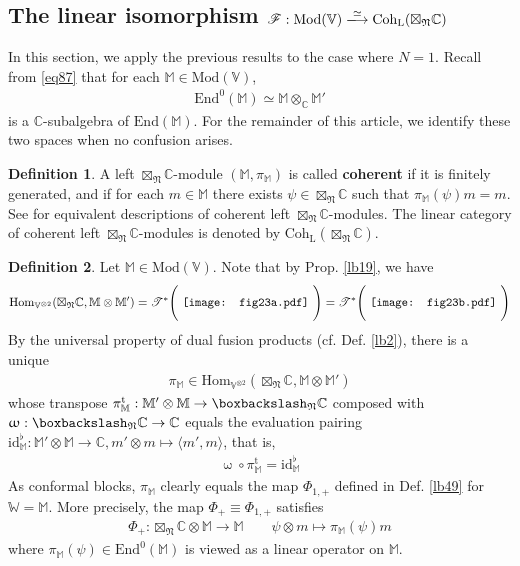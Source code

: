 \documentclass[11pt,b5paper,notitlepage]{article}
\theoremstyle{definition}
\newtheorem{df}{Definition}[section]
\theoremstyle{plain}
\newcommand{\tr}{\mathrm{t}} %
\newcommand{\End}{\mathrm{End}} %
\newcommand{\Hom}{\mathrm{Hom}}
\newcommand{\Vbb}{\mathbb V}
\newcommand{\Wbb}{\mathbb W}
\newcommand{\Mbb}{\mathbb M}
\newcommand{\Cbb}{\mathbb C}
\newcommand{\<}{\left\langle}
\renewcommand{\>}{\right\rangle}
\newcommand{\ST}{\mathscr{T}}
\newcommand{\SF}{\mathscr{F}}
\newcommand{\bk}[1]{\langle {#1}\rangle}
\newcommand{\bbs}{\boxbackslash}
\newcommand{\Mod}{\mathrm{Mod}}
\newcommand{\id}{\mathrm{id}}
\newcommand{\fn}{\mathfrak{N}}
\newcommand{\Coh}{{\mathrm{Coh}_{\mathrm L}}}
\numberwithin{equation}{section}
\begin{document}
\subsection{The linear isomorphism $\SF:\Mod(\Vbb)\xlongrightarrow{\simeq} \Coh(\boxtimes_\fn \Cbb)$}

In this section, we apply the previous results to the case where $N=1$. Recall from \eqref{eq87} that for each $\Mbb\in\Mod(\Vbb)$,
\begin{align*}
\End^0(\Mbb)\simeq \Mbb\otimes_\Cbb\Mbb'
\end{align*}
is a $\Cbb$-subalgebra of $\End(\Mbb)$. For the remainder of this article, we identify these two spaces when no confusion arises.



\begin{df}\label{lb83}
A left $\boxtimes_\fn\Cbb$-module $(\Mbb,\pi_\Mbb)$ is called \textbf{coherent} if it is finitely generated, and if for each $m\in\Mbb$ there exists $\psi\in\boxtimes_\fn\Cbb$ such that $\pi_\Mbb(\psi)m=m$. See \cite[Sec. 2]{GZ4} for equivalent descriptions of coherent left $\boxtimes_\fn\Cbb$-modules. The linear category of coherent left $\boxtimes_\fn\Cbb$-modules is denoted by $\pmb{\Coh(\boxtimes_\fn\Cbb)}$.
\end{df}

\begin{df}\label{lb57}
Let $\Mbb\in\Mod(\Vbb)$. Note that by Prop. \ref{lb19}, we have
\begin{align}
\Hom_{\Vbb^{\otimes2}}(\boxtimes_\fn\Cbb,\Mbb\otimes\Mbb')=\ST^*\Bigg(	\vcenter{\hbox{{
		\texttt{[image: fig23a.pdf]}}}} ~\Bigg)=\ST^*\Bigg(	\vcenter{\hbox{{
		\texttt{[image: fig23b.pdf]}}}} ~\Bigg)
\end{align}
By the universal property of dual fusion products (cf. Def. \ref{lb2}), there is a unique
\begin{align*}
\pi_\Mbb\in\Hom_{\Vbb^{\otimes2}}(\boxtimes_\fn\Cbb,\Mbb\otimes\Mbb')
\end{align*}
whose transpose $\pi_\Mbb^\tr:\Mbb'\otimes\Mbb\rightarrow\bbs_\fn\Cbb$ composed with $\upomega:\bbs_\fn\Cbb\rightarrow\Cbb$ equals the evaluation pairing $\id_\Mbb^\flat:\Mbb'\otimes\Mbb\rightarrow\Cbb,m'\otimes m\mapsto\bk{m',m}$, that is,
\begin{align*}
\upomega\circ\pi_\Mbb^\tr=\id_\Mbb^\flat
\end{align*}
As conformal blocks, $\pi_\Mbb$ clearly equals the map $\Phi_{1,+}$ defined in Def. \ref{lb49} for $\Wbb=\Mbb$. More precisely, the map $\Phi_+\equiv \Phi_{1,+}$ satisfies
\begin{gather}
\Phi_+:\boxtimes_\fn\Cbb\otimes\Mbb\rightarrow\Mbb\qquad \psi\otimes m\mapsto\pi_\Mbb(\psi)m
\end{gather}
where $\pi_\Mbb(\psi)\in\End^0(\Mbb)$ is viewed as a linear operator on $\Mbb$.
\end{df}
\end{document}
